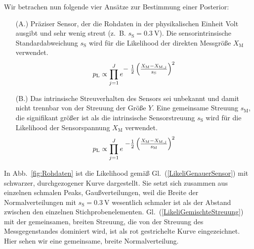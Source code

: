 Wir betrachen nun folgende vier Ansätze zur Bestimmung einer Posterior:

\begin{itemize}
	\item[(A.)] Präziser Sensor, 
	der die Rohdaten in der physikalischen Einheit Volt ausgibt und sehr wenig streut
	(z.~B. $s_\mathrm{S} = 0.3~\mathrm{V}$). Die sensorintrinsische Standardabweichung
	$s_\mathrm{S}$ wird für die Likelihood der direkten Messgröße $X_\mathrm{M}$ verwendet.
\begin{equation}
p_\mathrm{L} \propto \prod\limits_{j=1}^J 
e^{\textstyle -\;\frac{1}{2} \left(\frac{ X_\mathrm{M} - X_{\mathrm{M},j} }{s_\mathrm{S}} \right)^2}
\label{LikeliGenauerSensor}
\end{equation}
	\item[(B.)] Das intrinsische Streuverhalten des Sensors sei unbekannt und damit nicht
	trennbar von der Streuung der Größe $Y$. Eine gemeinsame Streuung $s_\mathrm{M}$, die signifikant
	größer ist als die intrinsische Sensorstreuung $s_\mathrm{S}$ wird für die Likelihood der
	Sensorspannung $X_\mathrm{M}$ verwendet.
\begin{equation}
p_\mathrm{L} \propto \prod\limits_{j=1}^J 
e^{\textstyle \; -\frac{1}{2} \left(\frac{X_\mathrm{M} - X_{\mathrm{M},j}}{s_\mathrm{M}} \right)^2}
\label{LikeliGemischteStreuung}
\end{equation}
\end{itemize}
In Abb.~\ref{fig:Rohdaten} ist die Likelihood gemäß Gl.~(\ref{LikeliGenauerSensor})
mit schwarzer, durchgezogener Kurve dargestellt. Sie setzt sich zusammen aus einzelnen
schmalen Peaks, Gaußverteilungen, weil die Breite der Normalverteilungen mit
$s_\mathrm{S} = 0.3~\mathrm{V}$ wesentlich schmaler ist als der Abstand zwischen den
einzelnen Stichprobenelementen. Gl.~(\ref{LikeliGemischteStreuung}) mit der gemeinsamen, breiten
Streuung, die von der Streuung des Messgegenstandes dominiert wird, ist als rot gestrichelte
Kurve eingezeichnet. Hier sehen wir eine gemeinsame, breite Normalverteilung.

